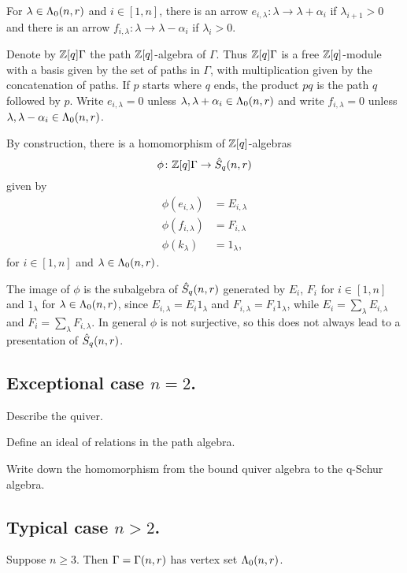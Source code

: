 \documentclass[a4paper, 11pt]{report}
\begin{document}
For $\lambda\in\Lambda_0(n,r)$ and $i\in [1,n]$, there is an arrow $e_{i,\lambda}:\lambda\to\lambda +\alpha_i$ if $\lambda_{i+1}>0$ and there is an arrow $f_{i,\lambda}:\lambda\to\lambda -\alpha_i$ if $\lambda_i>0$.

Denote by $\mathbb{Z}[q]\Gamma$ the path $\mathbb{Z}[q]$-algebra of $\Gamma$. Thus $\mathbb{Z}[q]\Gamma$ is a free $\mathbb{Z}[q]$-module with a basis given by the set of paths in $\Gamma$, with multiplication given by the concatenation of paths. If $p$ starts where $q$ ends, the product $pq$ is the path $q$ followed by $p$. Write $e_{i,\lambda}=0$ unless $\lambda,\lambda+\alpha_i\in\Lambda_0(n,r)$ and write $f_{i,\lambda}=0$ unless $\lambda,\lambda -\alpha_i\in\Lambda_0(n,r)$.

By construction, there is a homomorphism of $\mathbb{Z}[q]$-algebras
\begin{equation*}
\phi\colon \mathbb{Z}[q]\Gamma\to\hat{S}_q(n,r)
\end{equation*}
given by
\begin{align*}
\phi(e_{i,\lambda}) &= E_{i,\lambda}\\
\phi(f_{i,\lambda}) &= F_{i,\lambda}\\
\phi(k_\lambda) &= 1_{\lambda},
\end{align*}
for $i\in [1,n]$ and $\lambda\in\Lambda_0(n,r)$.

The image of $\phi$ is the subalgebra of $\hat{S}_q(n,r)$ generated by $E_i$, $F_i$ for $i\in [1,n]$ and $1_\lambda$ for $\lambda\in\Lambda_0(n,r)$, since $E_{i,\lambda}=E_i1_\lambda$ and $F_{i,\lambda}=F_i1_\lambda$, while $E_i = \sum_\lambda E_{i,\lambda}$ and $F_i = \sum_\lambda F_{i,\lambda}$. In general $\phi$ is not surjective, so this does not always lead to a presentation of $\hat{S}_q(n,r)$.

\subsection{Exceptional case $n=2$.}

Describe the quiver.

Define an ideal of relations in the path algebra.

Write down the homomorphism from the bound quiver algebra to the q-Schur algebra.

\subsection{Typical case $n>2$.}

Suppose $n\geq 3$. Then $\Gamma=\Gamma(n,r)$ has vertex set $\Lambda_0(n,r)$.\seeyoulater
\end{document}
